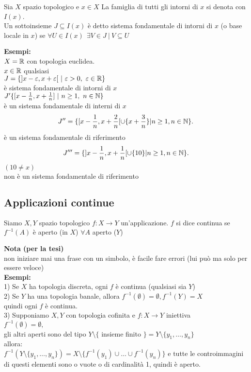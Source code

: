 \documentclass[12px]{article}
\begin{document}
	    \begin{defi}
	    	Sia $X$ spazio topologico e $x\in X$ La famiglia di tutti gli intorni di  $x$ si denota con $I(x)$.\\
		Un sottoinsieme $J\subseteq I(x)$ è detto sistema fondamentale di intorni di $x$ (o base locale in $x$) se $\forall U\in I(x)\ \  \exists V\in J \ |\ V\subseteq U $ 
	    \end{defi}
	    \textbf{Esempi:}\\
	    $X = \mathbb{R}$ con topologia euclidea.\\
	     $x\in\mathbb{R}$ qualsiasi\\
	     $J = \{]x - \varepsilon, x+ \varepsilon[ \ |\ \varepsilon > 0,  \ \varepsilon \in\R\} $\\
	     è sistema fondamentale di intorni di  $x$\\
	     $J'\{[x- \frac 1n, x + \frac 1n] \ | \ n\geq 1, \  n\in\mathbb{N}\}$ \\
	     è un sistema fondamentale di interni di $x$\\
	     \[
		      J''= \{[x-\frac 1n, x + \frac 2n[\cup \{x + \frac 3n \} | n\geq 1, n\in\mathbb{N}\}\\
	     .\] 
	     è un sistema fondamentale di riferimento
	      \[
		      J'''= \{]x-\frac 1n, x + \frac 1n[\cup \{10 \} | n\geq 1, n\in\mathbb{N}\}\\
	     .\] 
	     $(10\neq x)$\\
	     non è un sistema fondamentale di riferimento\\
	     \subsection{Applicazioni continue}
	     \begin{defi}
		     Siamo $X, Y$ spazio topologico $f : X \rightarrow Y$ un'applicazione. $f$ si dice continua se $f^{-1} (A)$ è aperto (in $X$) $\forall A$ aperto ($Y$)
	     \end{defi}
	     \textbf{Nota (per la tesi)}\\
	     non iniziare mai una frase con un simbolo, è facile fare errori  (lui può ma solo per essere veloce)\\
	     \textbf{Esempi:}\\
	     1) Se $X$ ha topologia discreta, ogni $f$ è continua (qualsiasi sia $Y$)\\
	     2) Se  $Y$ ha una topologia banale, allora $f^{-1}(\emptyset) =\emptyset, f^{-1}(Y) = X$\\
	     quindi ogni $f$ è continua.\\
	     3) Supponiamo $X,Y$ con topologia cofinita e $f:X \rightarrow Y$ iniettiva\\
	     $f^{-1}(\emptyset) = \emptyset, \ $\\
	     gli altri aperti sono del tipo $Y\setminus\{$ insieme finito  $\} = Y\setminus\{y_1,\ldots, y_n\}$\\
	     allora:\\
	     $f^{-1}(Y\setminus\{y_1,\ldots,y_n\}) = X\setminus\{f^{-1}(y_1)\cup\ldots\cup f^{-1}(y_n)\}$
	     e tutte le controimmagini di questi elementi sono o vuote o di cardinalità 1, quindi è aperto.
\end{document}
